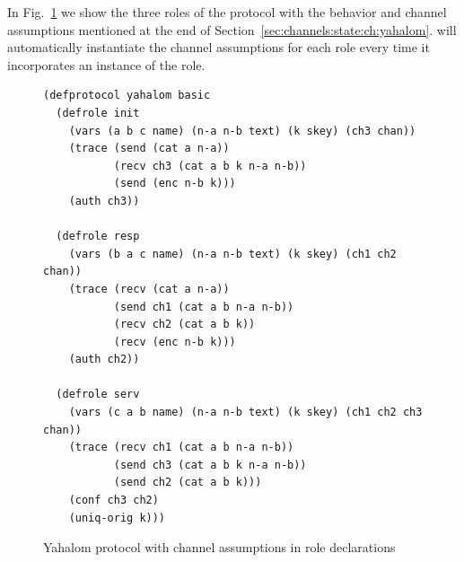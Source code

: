 In Fig.~\ref{fig:yahalom:ch:role} we show the three roles of the
protocol with the behavior and channel assumptions mentioned at the
end of Section~\ref{sec:channels:state:ch:yahalom}.  {\cpsa} will
automatically instantiate the channel assumptions for each role every
time it incorporates an instance of the role.
%
\begin{figure}\small
%
\begin{verbatim}(defprotocol yahalom basic
  (defrole init
    (vars (a b c name) (n-a n-b text) (k skey) (ch3 chan))
    (trace (send (cat a n-a))
           (recv ch3 (cat a b k n-a n-b))
           (send (enc n-b k)))
    (auth ch3))

  (defrole resp
    (vars (b a c name) (n-a n-b text) (k skey) (ch1 ch2 chan))
    (trace (recv (cat a n-a))
           (send ch1 (cat a b n-a n-b))
           (recv ch2 (cat a b k))
           (recv (enc n-b k)))
    (auth ch2))

  (defrole serv
    (vars (c a b name) (n-a n-b text) (k skey) (ch1 ch2 ch3 chan))
    (trace (recv ch1 (cat a b n-a n-b))
           (send ch3 (cat a b k n-a n-b))
           (send ch2 (cat a b k)))
    (conf ch3 ch2)
    (uniq-orig k)))\end{verbatim}
  \caption[Yahalom (role decls.)]{Yahalom protocol with channel
    assumptions in role declarations}
  \label{fig:yahalom:ch:role}
\end{figure}

